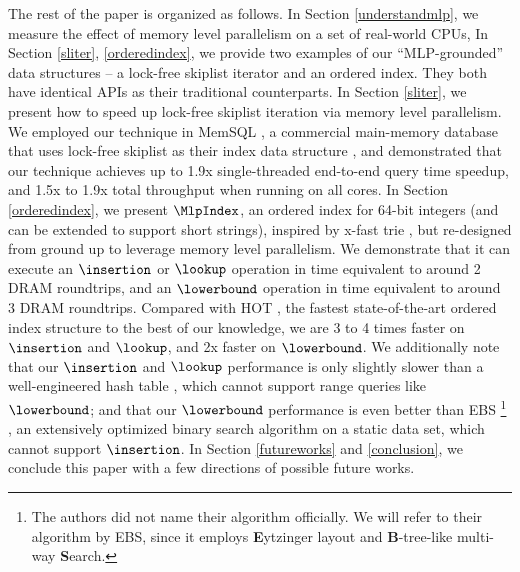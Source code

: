 \documentclass[11pt, usletter]{article}
\begin{document}
The rest of the paper is organized as follows. 
In Section \ref{understandmlp}, we measure the effect of memory level parallelism on a set of real-world CPUs, 
In Section \ref{sliter}, \ref{orderedindex}, 
we provide two examples of our ``MLP-grounded'' data structures -- a lock-free skiplist iterator and an ordered index. 
They both have identical APIs as their traditional counterparts.
In Section \ref{sliter}, we present how to speed up lock-free skiplist iteration via memory level parallelism. 
We employed our technique in MemSQL \cite{memsql},
a commercial main-memory database that uses lock-free skiplist \cite{lockfree_skiplist} as their index data structure \cite{memsqladamblog}, 
and demonstrated that our technique achieves up to 1.9x single-threaded end-to-end query time speedup, and 1.5x to 1.9x
total throughput when running on all cores.
In Section \ref{orderedindex}, we present $\MlpIndex$, an ordered index for 64-bit integers 
(and can be extended to support short strings), 
inspired by x-fast trie \cite{xfast}, but re-designed from ground up to leverage memory level parallelism. 
We demonstrate that it can execute an $\insertion$ or $\lookup$ operation in time equivalent to around 2 DRAM roundtrips, 
and an $\lowerbound$ operation in time equivalent to around 3 DRAM roundtrips. 
Compared with HOT \cite{hot_sigmod18}, the fastest state-of-the-art ordered index structure to the best of our knowledge, 
we are 3 to 4 times faster on $\insertion$ and $\lookup$, and 2x faster on $\lowerbound$.
We additionally note that our $\insertion$ and $\lookup$ performance is only slightly slower than a well-engineered hash table \cite{densehashset}, 
which cannot support range queries like $\lowerbound$;
and that our $\lowerbound$ performance is even better than EBS \footnote{The authors did not name their algorithm officially.
We will refer to their algorithm by EBS, since it employs \textbf{E}ytzinger layout and \textbf{B}-tree-like multi-way \textbf{S}earch.} \cite{binary_search_layout}, 
an extensively optimized binary search algorithm on a static data set, which cannot support $\insertion$.
In Section \ref{futureworks} and \ref{conclusion}, we conclude this paper with a few directions of possible future works.
\end{document}
